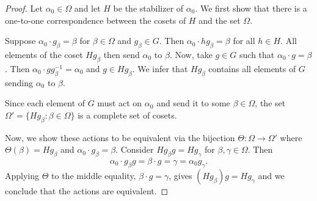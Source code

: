 \documentclass[main.tex]{subfiles}
\begin{document}
\begin{proof}
Let $\alpha_0 \in \Omega$ and let $H$ be the stabilizer of $\alpha_0$. We first show that there is a one-to-one correspondence between the cosets of $H$ and the set $\Omega$.

Suppose $\alpha_0 \cdot g_\beta = \beta$ for $\beta \in \Omega$ and $g_\beta \in G$. Then $\alpha_0 \cdot h g_\beta = \beta$ for all $h \in H$. All elements of the coset $H g_\beta$ then send $\alpha_0$ to $\beta$. Now, take $g \in G$ such that $\alpha_0 \cdot g = \beta$. Then $\alpha_0 \cdot g g_\beta^{-1} = \alpha_0$ and $g \in H g_\beta$. We infer that $H g_\beta$ contains all elements of $G$ sending $\alpha_0 $ to $\beta$.

Since each element of $G$ must act on $\alpha_0$ and send it to some $\beta \in \Omega$, the set $\Omega' = \{H g_\beta : \beta \in \Omega\}$ is a complete set of cosets.

Now, we show these actions to be equivalent via the bijection $\Theta: \Omega \to \Omega'$ where $\Theta(\beta) = H g_\beta$ and $\alpha_0 \cdot g_\beta = \beta$. Consider $H g_\beta g = H g_\gamma$ for $\beta, \gamma \in \Omega$. Then
$$\alpha_0 \cdot g_\beta g = \beta \cdot g = \gamma = \alpha_0 g_\gamma \text{.}$$
Applying $\Theta$ to the middle equality, $\beta \cdot g = \gamma$, gives $(H g_\beta) g = H g_\gamma$ and we conclude that the actions are equivalent.
\end{proof}
\end{document}
